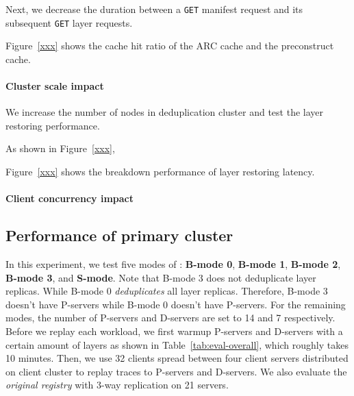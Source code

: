 Next, we decrease the duration between a \texttt{GET} manifest request and its subsequent \texttt{GET} layer requests.


Figure~\ref{xxx} shows the cache hit ratio of the ARC cache and the preconstruct cache.

\paragraph{Cluster scale impact}
We increase the number of nodes in \sysname deduplication cluster and test the layer restoring performance.

As shown in Figure~\ref{xxx},



Figure~\ref{xxx} shows the breakdown performance of layer restoring latency.


\paragraph{Client concurrency impact}





\subsection{Performance of primary cluster }
In this experiment,
we test five modes of \sysname:
\textbf{B-mode 0},
\textbf{B-mode 1},
\textbf{B-mode 2},
\textbf{B-mode 3}, and
\textbf{S-mode}.
Note that B-mode 3 does not deduplicate layer replicas.
While B-mode 0 \emph{deduplicates} all layer replicas. 
Therefore, B-mode 3 doesn't have P-servers while
B-mode 0 doesn't have P-servers.
For the remaining modes,
the number of P-servers and D-servers are set to 14 and 7 respectively.
Before we replay each workload, we first warmup P-servers and D-servers with a certain amount of layers as shown in Table~\ref{tab:eval-overall}, which roughly takes 10 minutes.
Then, we use 32 clients spread between four client servers distributed on client cluster to replay traces to P-servers and D-servers.
We also evaluate the \emph{original registry} with 3-way replication on 21 servers. 

